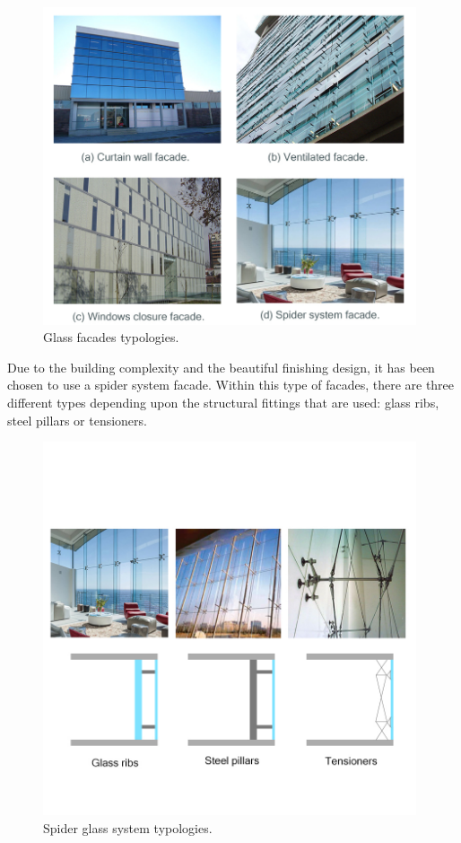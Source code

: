 	\begin{figure}[ht!]
	\centering
\includegraphics[width=11cm]{./images/Facade/facades}
\caption{Glass facades typologies.}
\end{figure}

Due to the building complexity and the beautiful finishing design, it has been chosen to use a spider system facade. Within this type of facades, there are three different types depending upon the structural fittings that are used: glass ribs, steel pillars or tensioners.

	\begin{figure}[ht!]
	\centering
\includegraphics[width=11cm]{./images/Facade/spiders}
\caption{Spider glass system typologies.}
\end{figure}

